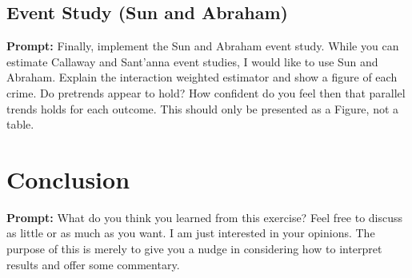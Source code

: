 \documentclass{article}
\begin{document}
	\subsection{Event Study (Sun and Abraham)}

	\textbf{Prompt: } Finally, implement the Sun and Abraham event study.  While you can estimate Callaway and Sant’anna event studies, I would like to use Sun and Abraham.  Explain the interaction weighted estimator and show a figure of each crime.  Do pretrends appear to hold?  How confident do you feel then that parallel trends holds for each outcome.  This should only be presented as a Figure, not a table.  

\section{Conclusion}

\textbf{Prompt: }What do you think you learned from this exercise?  Feel free to discuss as little or as much as you want.  I am just interested in your opinions.  The purpose of this is merely to give you a nudge in considering how to interpret results and offer some commentary. 
\end{document}
